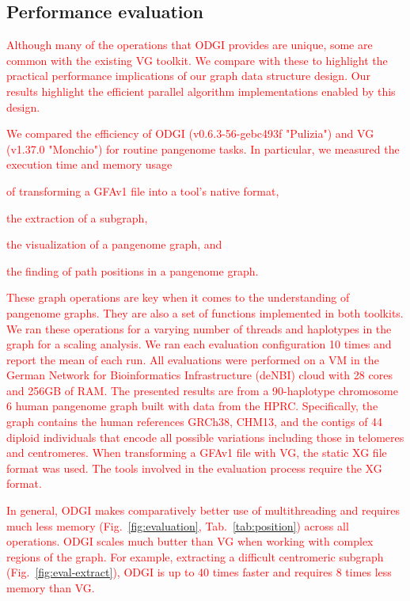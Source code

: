 \documentclass{bioinfo}
\newcommand{\REVIEWED}[1]{{\textcolor{Red}{#1}}}
\begin{document}
\vspace{0.22cm}

\subsection{Performance evaluation}
\label{sec:evaluation}

\REVIEWED{
Although many of the operations that ODGI provides are unique, some are common with the existing VG toolkit.
We compare with these to highlight the practical performance implications of our graph data structure design.
Our results highlight the efficient parallel algorithm implementations enabled by this design.}

\REVIEWED{We compared the efficiency of ODGI (v0.6.3-56-gebc493f "Pulizia") and VG (v1.37.0 "Monchio") for routine pangenome tasks. In particular, we measured the execution time and memory usage}
\begin{inparaenum}[(i)]
	\item \REVIEWED{of transforming a GFAv1 file into a tool's native format, }
	\item \REVIEWED{the extraction of a subgraph,}
	\item \REVIEWED{the visualization of a pangenome graph, and}
	\item \REVIEWED{the finding of path positions in a pangenome graph.}
\end{inparaenum}
\REVIEWED{These graph operations are key when it comes to the understanding of pangenome graphs.
They are also a set of functions implemented in both toolkits.
We ran these operations for a varying number of threads and haplotypes in the graph for a scaling analysis. We ran each evaluation configuration 10 times and report the mean of each run.
All evaluations were performed on a VM in the German Network for Bioinformatics Infrastructure (deNBI) cloud with 28 cores and 256GB of RAM.
The presented results are from a 90-haplotype chromosome 6 human pangenome graph built with data from the HPRC.
Specifically, the graph contains the human references GRCh38, CHM13, and the contigs of 44 diploid individuals that encode all possible variations including those in telomeres and centromeres.
When transforming a GFAv1 file with VG, the static XG file format was used.
The tools involved in the evaluation process require the XG format.}

\REVIEWED{In general, ODGI makes comparatively better use of multithreading and requires much less memory (Fig.~\ref{fig:evaluation}, Tab.~\ref{tab:position}) across all operations.
ODGI scales much butter than VG when working with complex regions of the graph.
For example, extracting a difficult centromeric subgraph (Fig.~\ref{fig:eval-extract}), ODGI is up to 40 times faster and requires 8 times less memory than VG.}
\end{document}

